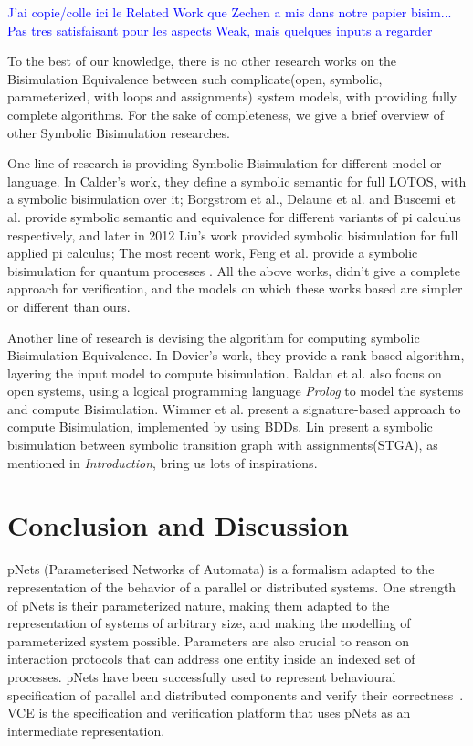 \documentclass{lmcs}
\newcommand{\ERIC}[1]{\textcolor{blue}{#1}}
\begin{document}
\ERIC{J'ai copie/colle ici le Related Work que Zechen a mis dans notre
  papier bisim...
  Pas tres satisfaisant pour les aspects Weak, mais quelques inputs a
  regarder}

To the best of our knowledge, there is no other research works on the Bisimulation Equivalence between such complicate(open, symbolic, parameterized, with loops and assignments) system models, with providing fully complete algorithms.
For the sake of completeness, we give a brief overview of other Symbolic Bisimulation researches.

One line of research is providing Symbolic Bisimulation for different model or language. 
In Calder's work\cite{calder2001symbolic}, they define a symbolic semantic for full LOTOS, with a symbolic bisimulation over it;
Borgstrom et al., Delaune et al. and Buscemi et al. provide symbolic semantic and equivalence for different variants of pi calculus respectively\cite{borgstrom2004symbolic}\cite{delaune2007symbolic}\cite{buscemi2008open}, and later in 2012 Liu's work provided symbolic bisimulation  for full applied pi calculus\cite{liu2010complete};
The most recent work, Feng et al. provide a symbolic bisimulation for quantum processes
\cite{feng2014symbolic}.
All the above works, didn't give a complete approach for verification, and the models on which these works based are simpler or different than ours.

Another line of research is devising the algorithm for computing symbolic Bisimulation Equivalence.
In Dovier's work, they provide a rank-based algorithm, layering the input model to compute bisimulation\cite{dovier2002rank}. 
Baldan et al. also focus on open systems, using a logical programming language \emph{Prolog} to model the systems and compute Bisimulation\cite{baldan2001compositional}.
Wimmer et al. present a signature-based approach to compute Bisimulation, implemented by using BDDs\cite{wimmer2006sigref}.
Lin present a symbolic bisimulation between symbolic transition graph with assignments(STGA), as mentioned in \emph{Introduction}, bring us lots of inspirations.

\section{Conclusion and Discussion}
\label{section:conclusion}
 pNets (Parameterised Networks of Automata) is a formalism adapted to the representation of the behavior of a parallel or distributed systems. One  strength of pNets is their parameterized nature, making them adapted to the representation of systems of arbitrary size, and making the modelling of parameterized system possible. Parameters are also crucial to reason on interaction protocols that can address one entity inside an indexed set of processes. pNets have been successfully used to represent behavioural specification of parallel and distributed components and verify their correctness~\cite{AmeurBoulifa2017,HKM-FASE16}. VCE is the specification and verification platform that uses pNets as an intermediate representation.
\end{document}
